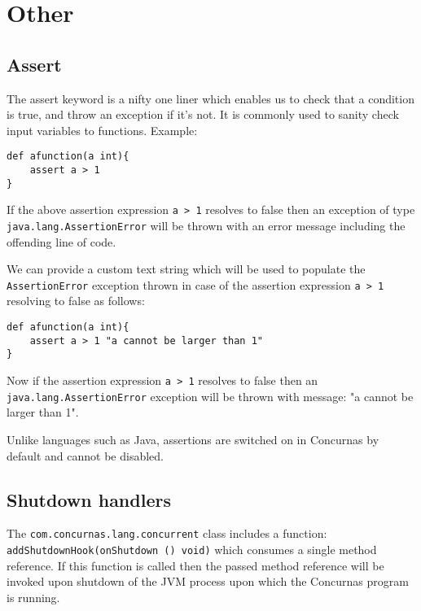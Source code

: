 \documentclass[conc-doc]{subfiles}
\begin{document}
	
	\chapter[Other]{Other}


\section{Assert}
The assert keyword is a nifty one liner which enables us to check that a condition is true, and throw an exception if it's not. It is commonly used to sanity check input variables to functions. Example:
\begin{lstlisting}
def afunction(a int){
	assert a > 1
}
\end{lstlisting}

If the above assertion expression \lstinline{a > 1} resolves to false then an exception of type \lstinline{java.lang.AssertionError} will be thrown with an error message including the offending line of code.

We can provide a custom text string which will be used to populate the \lstinline{AssertionError} exception thrown in case of the assertion expression \lstinline{a > 1} resolving to false as follows:
\begin{lstlisting}
def afunction(a int){
	assert a > 1 "a cannot be larger than 1"
}
\end{lstlisting}

Now if the assertion expression \lstinline{a > 1} resolves to false then an \lstinline{java.lang.AssertionError} exception will be thrown with message: "a cannot be larger than 1".

Unlike languages such as Java, assertions are switched on in Concurnas by default and cannot be disabled.

\section{Shutdown handlers}
\label{sec:shutdownHandle}
The \lstinline{com.concurnas.lang.concurrent} class includes a function: \lstinline{addShutdownHook(onShutdown () void)} which consumes a single method reference. If this function is called then the passed method reference will be invoked upon shutdown of the JVM process upon which the Concurnas program is running.
\end{document}
